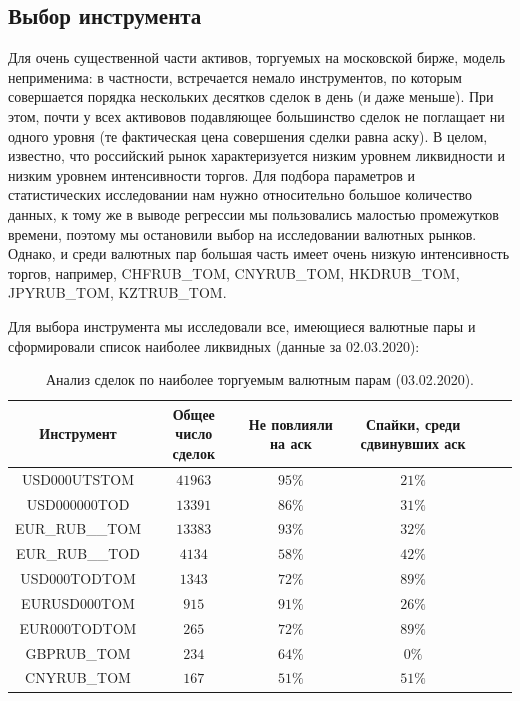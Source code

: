\subsection{Выбор инструмента}

Для очень существенной части активов, торгуемых на московской бирже, модель неприменима: в частности,
встречается немало инструментов, по которым совершается порядка нескольких десятков сделок в день (и даже меньше). При этом, почти у всех активовов подавляющее
большинство сделок не поглащает ни одного уровня (те фактическая цена совершения сделки равна аску). В целом, известно, что российский рынок 
характеризуется низким уровнем ликвидности и низким уровнем интенсивности торгов. 
Для подбора параметров и статистических исследовании
нам нужно относительно большое количество данных, к тому же в выводе регрессии мы пользовались малостью промежутков времени, 
поэтому мы остановили выбор на исследовании валютных рынков.
Однако, и среди валютных пар большая часть имеет очень низкую интенсивность торгов, например, CHFRUB\_TOM, CNYRUB\_TOM, HKDRUB\_TOM, 
JPYRUB\_TOM, KZTRUB\_TOM. \par
Для выбора инструмента мы исследовали все, имеющиеся валютные пары и сформировали список наиболее ликвидных (данные за 02.03.2020):

\begin{table}[h!]
    \begin{center}
        \begin{tabular}{|c|c|c|c|c|c|}
            \hline
        Инструмент        & Общее число сделок & Не повлияли на аск & Спайки, среди сдвинувших аск \\ \hline
        USD000UTSTOM      & $41963$ & $95\%$ & $21\%$ \\ \hline
        USD000000TOD      & $13391$ & $86\%$ & $31\%$ \\ \hline
        EUR\_RUB\_\_TOM   & $13383$ & $93\%$ & $32\%$ \\ \hline
        EUR\_RUB\_\_TOD   & $4134 $ & $58\%$ & $42\%$ \\ \hline
        USD000TODTOM      & $1343 $ & $72\%$ & $89\%$ \\ \hline
        EURUSD000TOM      & $915  $ & $91\%$ & $26\%$ \\ \hline
        EUR000TODTOM      & $265  $ & $72\%$ & $89\%$ \\ \hline
        GBPRUB\_TOM       & $234  $ & $64\%$ & $ 0\%$ \\ \hline
        CNYRUB\_TOM       & $167  $ & $51\%$ & $51\%$ \\ \hline
        \end{tabular}
    \end{center}
    \label{tableanalCU}
    \caption{Анализ сделок по наиболее торгуемым валютным парам (03.02.2020).}
\end{table} 

